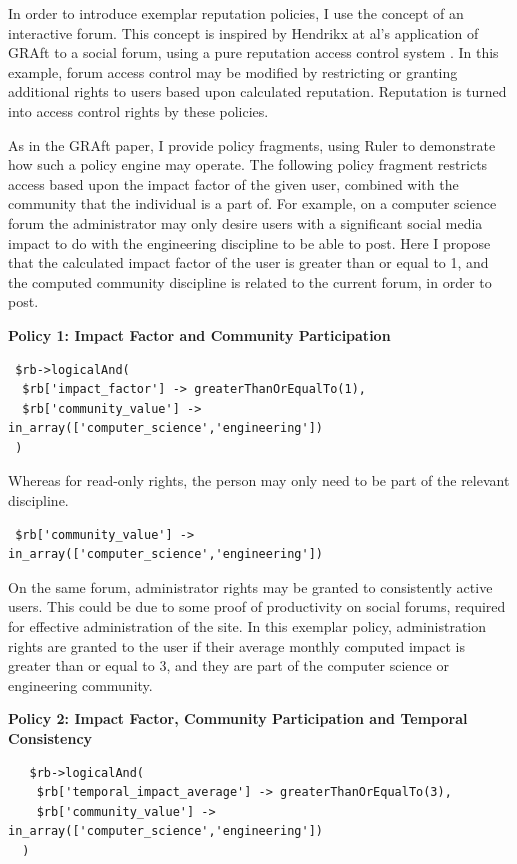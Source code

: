 In order to introduce exemplar reputation policies, I use the concept of an interactive forum. This concept is inspired by Hendrikx at al's application of GRAft to a social forum, using a pure reputation access control system \cite{graft_paper}. In this example, forum access control may be modified by restricting or granting additional rights to users based upon calculated reputation. Reputation is turned into access control rights by these policies.

As in the GRAft paper, I provide policy fragments, using Ruler\cite{} to demonstrate how such a policy engine may operate. The following policy fragment restricts access based upon the impact factor of the given user, combined with the community that the individual is a part of. For example, on a computer science forum the administrator may only desire users with a significant social media impact to do with the engineering discipline to be able to post. Here I propose that the calculated impact factor of the user is greater than or equal to 1, and the computed community discipline is related to the current forum, in order to post. 

\begin{center}
 \textbf{Policy 1: Impact Factor and Community Participation}
\begin{verbatim} 
 $rb->logicalAnd(
  $rb['impact_factor'] -> greaterThanOrEqualTo(1),
  $rb['community_value'] -> in_array(['computer_science','engineering'])
 ) 
\end{verbatim}
\end{center}

Whereas for read-only rights, the person may only need to be part of the relevant discipline.

\begin{verbatim}
 $rb['community_value'] -> in_array(['computer_science','engineering'])
\end{verbatim}

On the same forum, administrator rights may be granted to consistently active users. This could be due to some proof of productivity on social forums, required for effective administration of the site. In this exemplar policy, administration rights are granted to the user if their average monthly computed impact is greater than or equal to 3, and they are part of the computer science or engineering community. 

\begin{center}
 \textbf{Policy 2: Impact Factor, Community Participation and Temporal Consistency}
 \begin{verbatim}
   $rb->logicalAnd(
    $rb['temporal_impact_average'] -> greaterThanOrEqualTo(3),
    $rb['community_value'] -> in_array(['computer_science','engineering'])
  ) 
 \end{verbatim}
\end{center}

